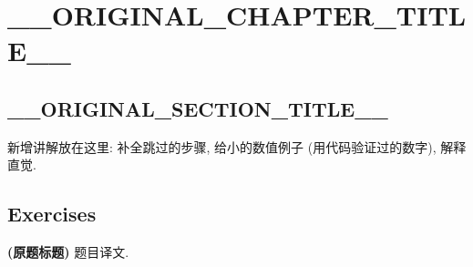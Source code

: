 \chapter{__ORIGINAL_CHAPTER_TITLE__}\label{ch:1}


\section{__ORIGINAL_SECTION_TITLE__}\label{sec:1.1}


\begin{jiedu}[这一段为什么成立]
	新增讲解放在这里: 补全跳过的步骤, 给小的数值例子 (用代码验证过的数字), 解释直觉.
\end{jiedu}

\section{Exercises}
\begin{Exercises}
	\item\label{exo:1.1} \textbf{(原题标题)} 题目译文.
\end{Exercises}
